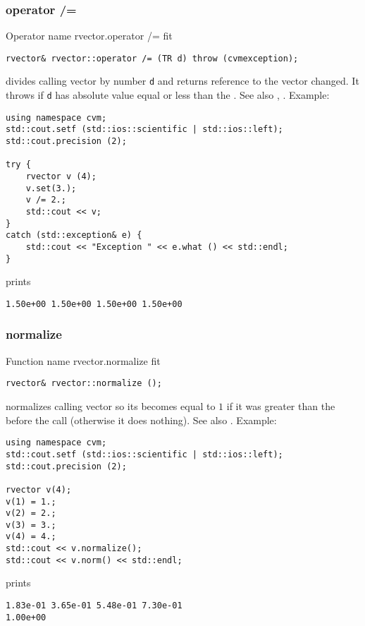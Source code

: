\subsubsection{operator /=}
Operator%
\pdfdest name {rvector.operator /=} fit
\begin{verbatim}
rvector& rvector::operator /= (TR d) throw (cvmexception);
\end{verbatim}
divides calling vector by number \verb"d"
and returns  reference to
the vector changed.
It throws  
if \verb"d" has  absolute value equal or less
than the 
.
See also ,
.
Example:
\begin{Verbatim}
using namespace cvm;
std::cout.setf (std::ios::scientific | std::ios::left); 
std::cout.precision (2);

try {
    rvector v (4);
    v.set(3.);
    v /= 2.;
    std::cout << v;
}
catch (std::exception& e) {
    std::cout << "Exception " << e.what () << std::endl;
}
\end{Verbatim}
prints
\begin{Verbatim}
1.50e+00 1.50e+00 1.50e+00 1.50e+00
\end{Verbatim}
\newpage


\subsubsection{normalize}
Function%
\pdfdest name {rvector.normalize} fit
\begin{verbatim}
rvector& rvector::normalize ();
\end{verbatim}
normalizes calling vector so its 
becomes equal to $1$ if it was greater than the 
before the call (otherwise it does nothing).
See also .
Example:
\begin{Verbatim}
using namespace cvm;
std::cout.setf (std::ios::scientific | std::ios::left); 
std::cout.precision (2);

rvector v(4);
v(1) = 1.;
v(2) = 2.;
v(3) = 3.;
v(4) = 4.;
std::cout << v.normalize();
std::cout << v.norm() << std::endl;
\end{Verbatim}
prints
\begin{Verbatim}
1.83e-01 3.65e-01 5.48e-01 7.30e-01
1.00e+00
\end{Verbatim}
\newpage


